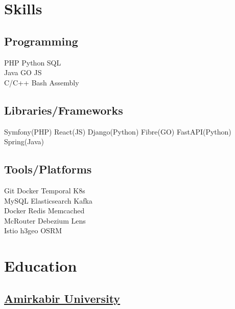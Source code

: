 \documentclass[]{plushcv}
\begin{document}
\begin{minipage}[t]{0.25\textwidth} 


\section{Skills}
\subsection{Programming}
\sectionsep
{}
PHP \textbullet{} Python \textbullet{} SQL \\
\sectionsep
{}
Java \textbullet{}  GO  \textbullet{} JS \\
\sectionsep
{}
C/C++ \textbullet{}  Bash \textbullet{} Assembly \textbullet{} 
\sectionsep
\sectionsep
\subsection{Libraries/Frameworks}
\sectionsep
Symfony(PHP) \textbullet{} React(JS) \textbullet{} Django(Python) \textbullet{} Fibre(GO) \textbullet{} FastAPI(Python) \textbullet Spring(Java)
\sectionsep
\sectionsep
\subsection{Tools/Platforms}
\sectionsep
Git \textbullet{} Docker \textbullet{} Temporal \textbullet K8s \\ MySQL  \textbullet{} Elasticsearch \textbullet{} Kafka \\ Docker \textbullet{} 
Redis \textbullet{} Memcached \\ McRouter \textbullet{} Debezium \textbullet{} Lens\\
Istio \textbullet{} h3geo \textbullet{} OSRM 

\sectionsep


\section{Education} 
\subsection{	\href{https://aut.ac.ir/en}{Amirkabir University}}


\end{minipage}
\end{document}
